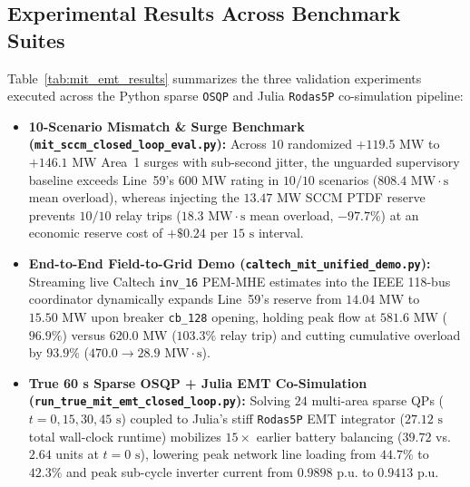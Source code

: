 \documentclass[journal]{IEEEtran}
\begin{document}
\subsection{Experimental Results Across Benchmark Suites}
Table~\ref{tab:mit_emt_results} summarizes the three validation experiments executed across the Python sparse \texttt{OSQP} and Julia \texttt{Rodas5P} co-simulation pipeline:
\begin{itemize}
    \item \textbf{10-Scenario Mismatch \& Surge Benchmark (\texttt{mit\_sccm\_closed\_loop\_eval.py}):} Across $10$ randomized $+119.5\text{ MW}$ to $+146.1\text{ MW}$ Area~1 surges with sub-second jitter, the unguarded supervisory baseline exceeds Line~59's $600\text{ MW}$ rating in $10/10$ scenarios ($808.4\text{ MW}\cdot\text{s}$ mean overload), whereas injecting the $13.47\text{ MW}$ SCCM PTDF reserve prevents $10/10$ relay trips ($18.3\text{ MW}\cdot\text{s}$ mean overload, $-97.7\%$) at an economic reserve cost of $+\$0.24$ per $15\text{ s}$ interval.
    \item \textbf{End-to-End Field-to-Grid Demo (\texttt{caltech\_mit\_unified\_demo.py}):} Streaming live Caltech \texttt{inv\_16} PEM-MHE estimates into the IEEE 118-bus coordinator dynamically expands Line~59's reserve from $14.04\text{ MW}$ to $15.50\text{ MW}$ upon breaker \texttt{cb\_128} opening, holding peak flow at $581.6\text{ MW}$ ($96.9\%$) versus $620.0\text{ MW}$ ($103.3\%$ relay trip) and cutting cumulative overload by $93.9\%$ ($470.0 \to 28.9\text{ MW}\cdot\text{s}$).
    \item \textbf{True 60 s Sparse OSQP + Julia EMT Co-Simulation (\texttt{run\_true\_mit\_emt\_closed\_loop.py}):} Solving $24$ multi-area sparse QPs ($t = 0, 15, 30, 45\text{ s}$) coupled to Julia's stiff \texttt{Rodas5P} EMT integrator ($27.12\text{ s}$ total wall-clock runtime) mobilizes $15\times$ earlier battery balancing ($39.72$ vs. $2.64$ units at $t=0\text{ s}$), lowering peak network line loading from $44.7\%$ to $42.3\%$ and peak sub-cycle inverter current from $0.9898\text{ p.u.}$ to $0.9413\text{ p.u.}$
\end{itemize}
\end{document}
